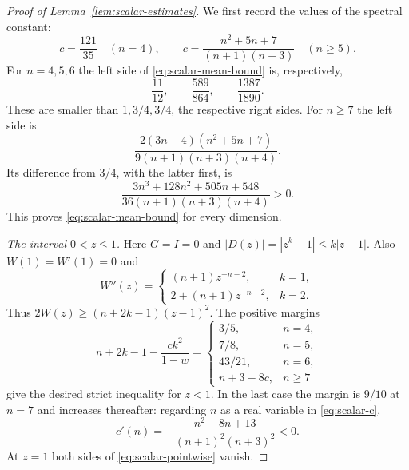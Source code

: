 \begin{proof}[Proof of Lemma~\ref{lem:scalar-estimates}]
We first record the values of the spectral constant:
\begin{equation}\label{eq:scalar-c}
 c=\frac{121}{35}\quad(n=4),\qquad
 c=\frac{n^2+5n+7}{(n+1)(n+3)}\quad(n\ge5).
\end{equation}
For $n=4,5,6$ the left side of \eqref{eq:scalar-mean-bound} is,
respectively,
\[
 \frac{11}{12},\qquad \frac{589}{864},\qquad \frac{1387}{1890}.
\]
These are smaller than $1,3/4,3/4$, the respective right sides.
For $n\ge7$ the left side is
\[
 \frac{2(3n-4)(n^2+5n+7)}{9(n+1)(n+3)(n+4)}.
\]
Its difference from $3/4$, with the latter first, is
\[
 \frac{3n^3+128n^2+505n+548}{36(n+1)(n+3)(n+4)}>0.
\]
This proves \eqref{eq:scalar-mean-bound} for every dimension.

\medskip
\noindent\emph{The interval $0<z\le1$.}
Here $G=I=0$ and $|D(z)|=|z^k-1|\le k|z-1|$.
Also $W(1)=W'(1)=0$ and
\[
 W''(z)=\begin{cases}
 (n+1)z^{-n-2},&k=1,\\
 2+(n+1)z^{-n-2},&k=2.
 \end{cases}
\]
Thus $2W(z)\ge(n+2k-1)(z-1)^2$.  The positive margins
\begin{equation}\label{eq:scalar-local-margin}
 n+2k-1-\frac{ck^2}{1-w}
 =\begin{cases}
 3/5,&n=4,\\
 7/8,&n=5,\\
 43/21,&n=6,\\
 n+3-8c,&n\ge7
 \end{cases}
\end{equation}
give the desired strict inequality for $z<1$.  In the last case the
margin is $9/10$ at $n=7$ and increases thereafter: regarding $n$ as a
real variable in \eqref{eq:scalar-c},
\[
 c'(n)=-\frac{n^2+8n+13}{(n+1)^2(n+3)^2}<0.
\]
At $z=1$ both sides of \eqref{eq:scalar-pointwise} vanish.


\end{proof}
